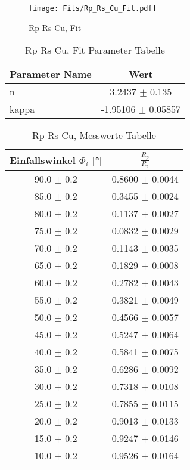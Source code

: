 \begin{figure}[ht] 
 	\centering 
 	\texttt{[image: Fits/Rp\_Rs\_Cu\_Fit.pdf]} 
	\caption{Rp Rs Cu, Fit} 
 	\label{fig:Rp Rs Cu, Fit} 
\end{figure}
 
\begin{table}[ht] 
	\centering 
	\caption{Rp Rs Cu, Fit Parameter Tabelle} 
	\label{tab: Rp Rs Cu, Fit Parameter Tabelle}
	\begin{tabular}{|l|c|}
		\hline
		Parameter Name	&	Wert \\ \hline
		n	&	 3.2437 $\pm$  0.135\\ \hline
		kappa	&	-1.95106 $\pm$  0.05857\\ \hline
	\end{tabular} 
\end{table}
 
\begin{table}[ht] 
	\centering 
	\caption{Rp Rs Cu, Messwerte Tabelle} 
	\label{tab: Rp Rs Cu, Messwerte Tabelle}
	\begin{tabular}{|c|c|}
		\hline
		Einfallswinkel $\Phi_i$ [°] 	&	 $\frac{R_p}{R_s}$\\ \hline
		90.0 $\pm$ 0.2 	&	 0.8600 $\pm$ 0.0044 \\ \hline
		85.0 $\pm$ 0.2 	&	 0.3455 $\pm$ 0.0024 \\ \hline
		80.0 $\pm$ 0.2 	&	 0.1137 $\pm$ 0.0027 \\ \hline
		75.0 $\pm$ 0.2 	&	 0.0832 $\pm$ 0.0029 \\ \hline
		70.0 $\pm$ 0.2 	&	 0.1143 $\pm$ 0.0035 \\ \hline
		65.0 $\pm$ 0.2 	&	 0.1829 $\pm$ 0.0008 \\ \hline
		60.0 $\pm$ 0.2 	&	 0.2782 $\pm$ 0.0043 \\ \hline
		55.0 $\pm$ 0.2 	&	 0.3821 $\pm$ 0.0049 \\ \hline
		50.0 $\pm$ 0.2 	&	 0.4566 $\pm$ 0.0057 \\ \hline
		45.0 $\pm$ 0.2 	&	 0.5247 $\pm$ 0.0064 \\ \hline
		40.0 $\pm$ 0.2 	&	 0.5841 $\pm$ 0.0075 \\ \hline
		35.0 $\pm$ 0.2 	&	 0.6286 $\pm$ 0.0092 \\ \hline
		30.0 $\pm$ 0.2 	&	 0.7318 $\pm$ 0.0108 \\ \hline
		25.0 $\pm$ 0.2 	&	 0.7855 $\pm$ 0.0115 \\ \hline
		20.0 $\pm$ 0.2 	&	 0.9013 $\pm$ 0.0133 \\ \hline
		15.0 $\pm$ 0.2 	&	 0.9247 $\pm$ 0.0146 \\ \hline
		10.0 $\pm$ 0.2 	&	 0.9526 $\pm$ 0.0164 \\ \hline
	\end{tabular} 
\end{table}
 
